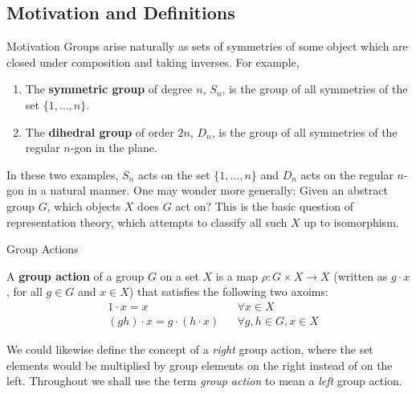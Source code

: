 \subsection{Motivation and Definitions}
\begin{frame}{Motivation}
Groups arise naturally as sets of symmetries of some object which are closed under composition and taking inverses.  For example, 
\begin{enumerate}
\item The \textbf{symmetric group} of degree $n$, $S_n$, is the group of all symmetries of the set $\{ 1, \ldots, n \}$.
\item The \textbf{dihedral group} of order $2n$, $D_{n}$, is the group of all symmetries of the regular $n$-gon in the plane.
\end{enumerate}
In these two examples, $S_n$  acts on the set $\{ 1, \ldots, n \}$ and $D_{n}$ acts on the regular $n$-gon in a natural manner. One may wonder more generally:  Given an abstract group $G$, which objects $X$ does $G$ act on?
This is the basic question of representation theory, which attempts to classify all such $X$ up to isomorphism.
\end{frame}

\begin{frame}{Group Actions}
\begin{definition}
A  \textbf{group action} of a group $G$ on a set $X$ is a map $\rho \colon G \times X \to X$ (written as $g \cdot x$, for all $g \in G$ and $x \in X$) that satisfies the following two axoims:
\begin{align}
\label{grp-action-axiom-1}&1 \cdot  x = x && \forall x \in X\\
\label{grp-action-axiom-2}&(gh) \cdot x  = g \cdot (h \cdot x) && \forall g,h \in G, x \in X
\end{align}
\end{definition}
\end{frame}
\begin{note}
We could likewise define the concept of a \textit{right} group action, where the set elements would be multiplied by group elements on the right instead of on the left.  Throughout we shall use the term \textit{group action} to mean a \textit{left} group action.
 \end{note}


